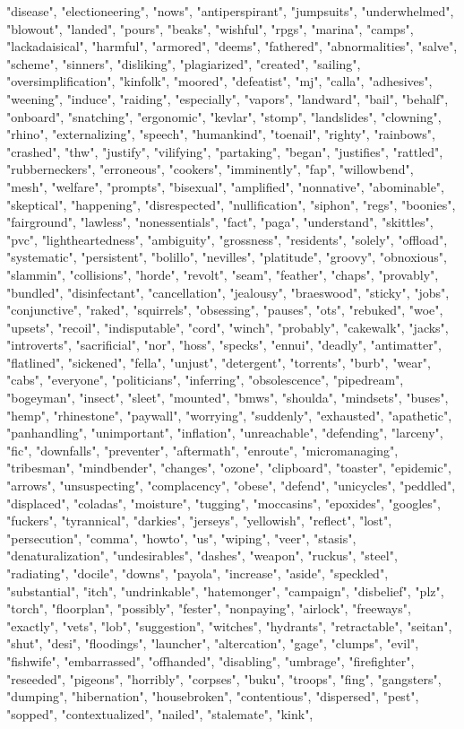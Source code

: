 "disease", "electioneering", "nows", "antiperspirant", "jumpsuits", "underwhelmed", "blowout", "landed", "pours", "beaks", "wishful", "rpgs", "marina", "camps", "lackadaisical", "harmful", "armored", "deems", "fathered", "abnormalities", "salve", "scheme", "sinners", "disliking", "plagiarized", "created", "sailing", "oversimplification", "kinfolk", "moored", "defeatist", "mj", "calla", "adhesives", "weening", "induce", "raiding", "especially", "vapors", "landward", "bail", "behalf", "onboard", "snatching", "ergonomic", "kevlar", "stomp", "landslides", "clowning", "rhino", "externalizing", "speech", "humankind", "toenail", "righty", "rainbows", "crashed", "thw", "justify", "vilifying", "partaking", "began", "justifies", "rattled", "rubberneckers", "erroneous", "cookers", "imminently", "fap", "willowbend", "mesh", "welfare", "prompts", "bisexual", "amplified", "nonnative", "abominable", "skeptical", "happening", "disrespected", "nullification", "siphon", "regs", "boonies", "fairground", "lawless", "nonessentials", "fact", "paga", "understand", "skittles", "pvc", "lightheartedness", "ambiguity", "grossness", "residents", "solely", "offload", "systematic", "persistent", "bolillo", "nevilles", "platitude", "groovy", "obnoxious", "slammin", "collisions", "horde", "revolt", "seam", "feather", "chaps", "provably", "bundled", "disinfectant", "cancellation", "jealousy", "braeswood", "sticky", "jobs", "conjunctive", "raked", "squirrels", "obsessing", "pauses", "ots", "rebuked", "woe", "upsets", "recoil", "indisputable", "cord", "winch", "probably", "cakewalk", "jacks", "introverts", "sacrificial", "nor", "hoss", "specks", "ennui", "deadly", "antimatter", "flatlined", "sickened", "fella", "unjust", "detergent", "torrents", "burb", "wear", "cabs", "everyone", "politicians", "inferring", "obsolescence", "pipedream", "bogeyman", "insect", "sleet", "mounted", "bmws", "shoulda", "mindsets", "buses", "hemp", "rhinestone", "paywall", "worrying", "suddenly", "exhausted", "apathetic", "panhandling", "unimportant", "inflation", "unreachable", "defending", "larceny", "fic", "downfalls", "preventer", "aftermath", "enroute", "micromanaging", "tribesman", "mindbender", "changes", "ozone", "clipboard", "toaster", "epidemic", "arrows", "unsuspecting", "complacency", "obese", "defend", "unicycles", "peddled", "displaced", "coladas", "moisture", "tugging", "moccasins", "epoxides", "googles", "fuckers", "tyrannical", "darkies", "jerseys", "yellowish", "reflect", "lost", "persecution", "comma", "howto", "us", "wiping", "veer", "stasis", "denaturalization", "undesirables", "dashes", "weapon", "ruckus", "steel", "radiating", "docile", "downs", "payola", "increase", "aside", "speckled", "substantial", "itch", "undrinkable", "hatemonger", "campaign", "disbelief", "plz", "torch", "floorplan", "possibly", "fester", "nonpaying", "airlock", "freeways", "exactly", "vets", "lob", "suggestion", "witches", "hydrants", "retractable", "seitan", "shut", "desi", "floodings", "launcher", "altercation", "gage", "clumps", "evil", "fishwife", "embarrassed", "offhanded", "disabling", "umbrage", "firefighter", "reseeded", "pigeons", "horribly", "corpses", "buku", "troops", "fing", "gangsters", "dumping", "hibernation", "housebroken", "contentious", "dispersed", "pest", "sopped", "contextualized", "nailed", "stalemate", "kink", 